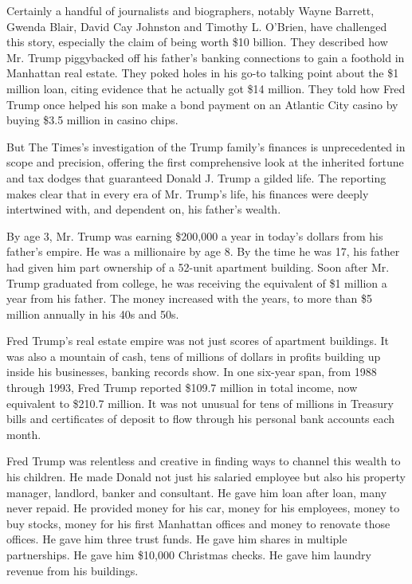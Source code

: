 Certainly a handful of journalists and biographers, notably Wayne
Barrett, Gwenda Blair, David Cay Johnston and Timothy L. O'Brien, have
challenged this story, especially the claim of being worth \$10 billion.
They described how Mr. Trump piggybacked off his father's banking
connections to gain a foothold in Manhattan real estate. They poked
holes in his go-to talking point about the \$1 million loan, citing
evidence that he actually got \$14 million. They told how Fred Trump
once helped his son make a bond payment on an Atlantic City casino by
buying \$3.5 million in casino chips.

But The Times's investigation of the Trump family's finances is
unprecedented in scope and precision, offering the first comprehensive
look at the inherited fortune and tax dodges that guaranteed Donald J.
Trump a gilded life. The reporting makes clear that in every era of Mr.
Trump's life, his finances were deeply intertwined with, and dependent
on, his father's wealth.

By age 3, Mr. Trump was earning \$200,000 a year in today's dollars from
his father's empire. He was a millionaire by age 8. By the time he was
17, his father had given him part ownership of a 52-unit apartment
building. Soon after Mr. Trump graduated from college, he was receiving
the equivalent of \$1 million a year from his father. The money
increased with the years, to more than \$5 million annually in his 40s
and 50s.

Fred Trump's real estate empire was not just scores of apartment
buildings. It was also a mountain of cash, tens of millions of dollars
in profits building up inside his businesses, banking records show. In
one six-year span, from 1988 through 1993, Fred Trump reported \$109.7
million in total income, now equivalent to \$210.7 million. It was not
unusual for tens of millions in Treasury bills and certificates of
deposit to flow through his personal bank accounts each month.

Fred Trump was relentless and creative in finding ways to channel this
wealth to his children. He made Donald not just his salaried employee
but also his property manager, landlord, banker and consultant. He gave
him loan after loan, many never repaid. He provided money for his car,
money for his employees, money to buy stocks, money for his first
Manhattan offices and money to renovate those offices. He gave him three
trust funds. He gave him shares in multiple partnerships. He gave him
\$10,000 Christmas checks. He gave him laundry revenue from his
buildings.

